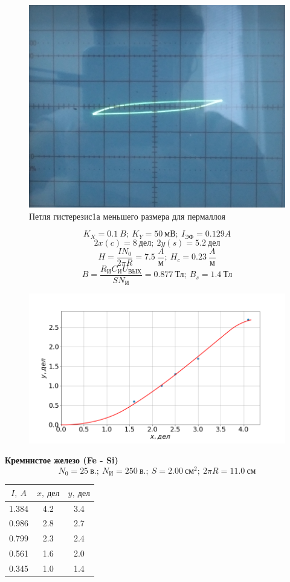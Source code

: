 \documentclass[a4paper, fontsize=14pt]{article}
\begin{document}
\begin{figure}[H]
\center
\includegraphics[scale=0.1]{per2.jpg}
\caption{Петля гистерезис1а меньшего размера для пермаллоя}
\end{figure}

\[
	K_X = 0.1\ B;\ K_Y = 50\ \text{мВ};\ I_\text{ЭФ} = 0.129 A
\]
\[
	2x(c) = 8\ \text{дел};\ 2y(s) = 5.2\ \text{дел}
\]
\[
	H = \frac{I N_0}{2 \pi R} = 7.5\ \frac{A}{\text{м}};\ H_c = 0.23\ \frac{A}{\text{м}}
\]
\[
B = \frac{R_\text{И} C_\text{И} U_\text{ВЫХ}}{S N_\text{И}} = 0.877\ \text{Тл};\ B_s = 1.4\ \text{Тл}
\]
\begin{figure}[H]
\center
\includegraphics[scale=0.4]{11.png}

\end{figure}
\textbf{Кремнистое железо (Fe - Si)}
\[
	N_0 = 25\ \text{в.};\ N_\text{И} = 250\ \text{в.};\ S = 2.00\ \text{см}^2;\ 2 \pi R = 11.0\ \text{см}
\]
\begin{table}[H]
	\centering
	\begin{tabular}{|c|c|c|} \hline
		$I,\ A$ &  $x,\ \text{дел}$ & $y,\ \text{дел}$ \\\hline
		1.384 & 4.2 & 3.4 \\\hline
		0.986 & 2.8 & 2.7 \\\hline
		0.799 & 2.3 & 2.4 \\\hline
		0.561 & 1.6 & 2.0 \\\hline
		0.345 & 1.0 & 1.4 \\\hline
	\end{tabular}	
\end{table}
\end{document}
